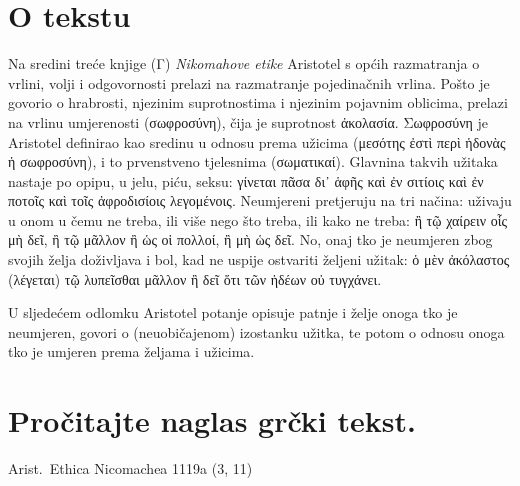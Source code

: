 


\section*{O tekstu}

Na sredini treće knjige (Γ) \textit{Nikomahove etike} Aristotel s općih razmatranja o vrlini, volji i odgovornosti prelazi na razmatranje pojedinačnih vrlina. Pošto je govorio o hrabrosti, njezinim suprotnostima i njezinim pojavnim oblicima, prelazi na vrlinu umjerenosti \textgreek[variant=ancient]{(σωφροσύνη),} čija je suprotnost \textgreek[variant=ancient]{ἀκολασία.  Σωφροσύνη} je Aristotel definirao kao sredinu u odnosu prema užicima \textgreek[variant=ancient]{(μεσότης ἐστὶ περὶ ἡδονὰς ἡ σωφροσύνη),} i to prvenstveno tjelesnima \textgreek[variant=ancient]{(σωματικαί).} Glavnina takvih užitaka nastaje po opipu, u jelu, piću, seksu: \textgreek[variant=ancient]{γίνεται πᾶσα δι᾽ ἁφῆς καὶ ἐν σιτίοις καὶ ἐν ποτοῖς καὶ τοῖς ἀφροδισίοις λεγομένοις.} Neumjereni pretjeruju na tri načina: uživaju u onom u čemu ne treba, ili više nego što treba, ili kako ne treba: \textgreek[variant=ancient]{ἢ τῷ χαίρειν οἷς μὴ δεῖ, ἢ τῷ μᾶλλον ἢ ὡς οἱ πολλοί, ἢ μὴ ὡς δεῖ.} No, onaj tko je neumjeren zbog svojih želja doživljava i bol, kad ne uspije ostvariti željeni užitak: \textgreek[variant=ancient]{ὁ μὲν ἀκόλαστος (λέγεται) τῷ λυπεῖσθαι μᾶλλον ἢ δεῖ ὅτι τῶν ἡδέων οὐ τυγχάνει.}

U sljedećem odlomku Aristotel potanje opisuje patnje i želje onoga tko je neumjeren, govori o (neuobičajenom) izostanku užitka, te potom o odnosu onoga tko je umjeren prema željama i užicima.


\section*{Pročitajte naglas grčki tekst.}

Arist.\ Ethica Nicomachea 1119a (3, 11)


\medskip


